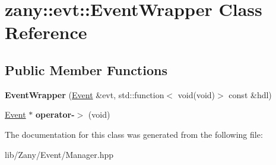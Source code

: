 \hypertarget{classzany_1_1evt_1_1_event_wrapper}{}\section{zany\+:\+:evt\+:\+:Event\+Wrapper Class Reference}
\label{classzany_1_1evt_1_1_event_wrapper}
\subsection*{Public Member Functions}
\begin{DoxyCompactItemize}
\item 
\mbox{\label{classzany_1_1evt_1_1_event_wrapper_ab62ec05da6df94bed17fa978ffee93ce}} 
{\bfseries Event\+Wrapper} (\hyperlink{classzany_1_1evt_1_1_event}{Event} \&evt, std\+::function$<$ void(void)$>$ const \&hdl)
\item 
\mbox{\label{classzany_1_1evt_1_1_event_wrapper_af83a91477f1639eec56550cc1fa2a9a8}} 
\hyperlink{classzany_1_1evt_1_1_event}{Event} $\ast$ {\bfseries operator-\/$>$} (void)
\end{DoxyCompactItemize}


The documentation for this class was generated from the following file\+:\begin{DoxyCompactItemize}
\item 
lib/\+Zany/\+Event/Manager.\+hpp\end{DoxyCompactItemize}
